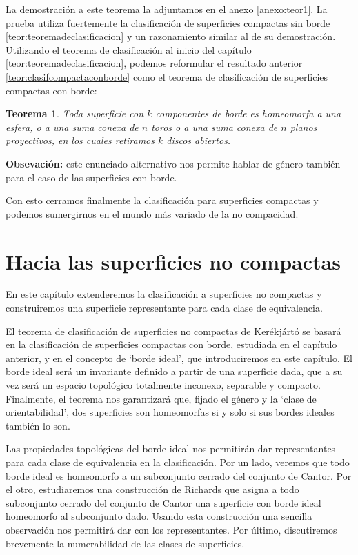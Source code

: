 \documentclass[a4paper,11pt,spanish, twoside, leqno]{tfg-uam}
\newtheorem*{teorsin}{Teorema}
\theoremstyle{definition}
\begin{document}
La demostración a este teorema la adjuntamos en el anexo \ref{anexo:teor1}. La prueba utiliza fuertemente la clasificación de superficies compactas sin borde \ref{teor:teoremadeclasificacion} y un razonamiento similar al de su demostración. \\
Utilizando el teorema de clasificación al inicio del capítulo \ref{teor:teoremadeclasificacion}, podemos reformular el resultado anterior \ref{teor:clasifcompactaconborde} como el teorema de clasificación de superficies compactas con borde:

\begin{teorsin}
Toda superficie con $k$ componentes de borde es homeomorfa a una esfera, o a una suma conexa de $n$ toros o a una suma conexa de $n$ planos proyectivos, en los cuales retiramos $k$ discos abiertos.
\end{teorsin}
\noindent \textbf{Obsevación:} este enunciado alternativo nos permite hablar de género también para el caso de las superficies con borde. 

Con esto cerramos finalmente la clasificación para superficies compactas y  podemos sumergirnos en el mundo más variado de la no compacidad.



\chapter{Hacia las superficies no compactas}
En este capítulo extenderemos la clasificación a superficies no compactas y construiremos una superficie representante para cada clase de equivalencia.

El teorema de clasificación de superficies no compactas de Kerékjártó se basará en la clasificación de superficies compactas con borde, estudiada en el capítulo anterior, y en el concepto de `borde ideal', que introduciremos en este capítulo. El borde ideal será un invariante  definido a partir de una superficie dada, que a su vez será un espacio topológico totalmente inconexo, separable y compacto. Finalmente, el teorema nos garantizará que, fijado el género y la `clase de orientabilidad', dos superficies son homeomorfas si y solo si sus bordes ideales también lo son.

Las propiedades topológicas del borde ideal nos permitirán dar representantes para cada clase de equivalencia en la clasificación. Por un lado, veremos que todo borde ideal es homeomorfo a un subconjunto cerrado del conjunto de Cantor. Por el otro, estudiaremos una construcción de Richards que  asigna a todo subconjunto cerrado del conjunto de Cantor una superficie con borde ideal homeomorfo al subconjunto dado. Usando esta construcción una sencilla observación nos permitirá dar con los representantes. Por último, discutiremos brevemente la numerabilidad de las clases de superficies. 
\end{document}
